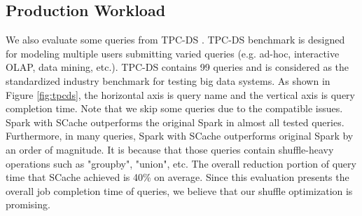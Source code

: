 \subsection{Production Workload}
We also evaluate some queries from TPC-DS \cite{tpcds}. 
TPC-DS benchmark is designed for modeling multiple users submitting varied queries (e.g. ad-hoc, interactive OLAP, data mining, etc.). 
TPC-DS contains 99 queries and is considered as the standardized industry benchmark for testing big data systems. 
\ifrevision
\reversemarginpar
{}
\fi
As shown in Figure \ref{fig:tpcds}, the horizontal axis is query name and the vertical axis is query completion time. 
Note that we skip some queries due to the compatible issues. 
Spark with SCache outperforms the original Spark in almost all tested queries. 
Furthermore, in many queries, Spark with SCache outperforms original Spark by an order of magnitude. 
It is because that those queries contain shuffle-heavy operations such as "groupby", "union", etc.
The overall reduction portion of query time that SCache achieved is 40\% on average. 
Since this evaluation presents the overall job completion time of queries, we believe that our shuffle optimization is promising.
